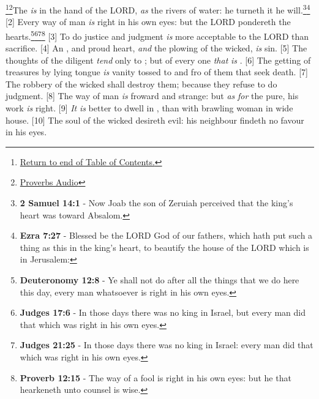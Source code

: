 \footnote{\textcolor[cmyk]{0.99998,1,0,0}{\hyperlink{TOC}{Return to end of Table of Contents.}}}\footnote{\href{https://audiobible.com/bible/proverbs_21.html}{\textcolor[cmyk]{0.99998,1,0,0}{Proverbs Audio}}}\textcolor[cmyk]{0.99998,1,0,0}{The  \emph{is} in the hand of the LORD, \emph{as} the rivers of water: he turneth it  he will.}\footnote{\textbf{2 Samuel 14:1} - Now Joab the son of Zeruiah perceived that the king’s heart was toward Absalom.}\footnote{\textbf{Ezra 7:27} - Blessed be the LORD God of our fathers, which hath put such a thing as this in the king’s heart, to beautify the house of the LORD which is in Jerusalem:}
[2] \textcolor[cmyk]{0.99998,1,0,0}{Every way of   man \emph{is} right in his own eyes: but the LORD pondereth the hearts.}\footnote{\textbf{Deuteronomy 12:8} - Ye shall not do after all the things that we do here this day, every man whatsoever is right in his own eyes.}\footnote{\textbf{Judges 17:6} - In those days there was no king in Israel, but every man did that which was right in his own eyes.}\footnote{\textbf{Judges 21:25} - In those days there was no king in Israel: every man did that which was right in his own eyes.}\footnote{\textbf{Proverb 12:15} - The way of a fool is right in his own eyes: but he that hearkeneth unto counsel is wise.}
[3] \textcolor[cmyk]{0.99998,1,0,0}{To do justice and judgment \emph{is} more acceptable to the LORD than sacrifice.}
[4] \textcolor[cmyk]{0.99998,1,0,0}{An , and   proud heart, \emph{and} the plowing of the wicked, \emph{is} sin.}
[5] \textcolor[cmyk]{0.99998,1,0,0}{The thoughts of the diligent \emph{tend} only to ; but of every one \emph{that} \emph{is} .}
[6] \textcolor[cmyk]{0.99998,1,0,0}{The getting of treasures by   lying tongue \emph{is}   vanity tossed to and fro of them that seek death.}
[7] \textcolor[cmyk]{0.99998,1,0,0}{The robbery of the wicked shall destroy them; because they refuse to do judgment.}
[8] \textcolor[cmyk]{0.99998,1,0,0}{The way of man \emph{is} froward and strange: but \emph{as} \emph{for} the pure, his work \emph{is} right.}
[9] \textcolor[cmyk]{0.99998,1,0,0}{\emph{It} \emph{is} better to dwell in   , than with   brawling woman in  wide house.}
[10] \textcolor[cmyk]{0.99998,1,0,0}{The soul of the wicked desireth evil: his neighbour findeth no favour in his eyes.}
